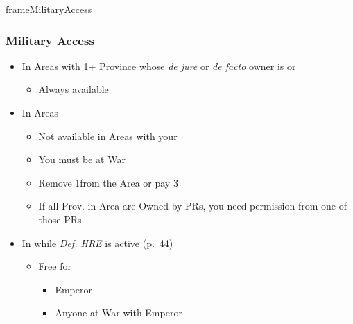 \documentclass[10pt]{article}
\begin{document}
\begin{dynamiccontents*}{frameMilitaryAccess}
	\subsubsection*{Military Access }
	\begin{itemize}
		\item In Areas with 1+ Province whose \emph{de jure} or \emph{de facto} owner is  or 
		\begin{itemize}
			\item Always available
		\end{itemize}
		\item In  Areas
		\begin{itemize}
			\item Not available in Areas with your \claims
			\item You must be at War
			\item Remove 1\influence from the Area or pay 3\ducats
			\item If all Prov. in Area are Owned by PRs, you need permission from one of those PRs
		\end{itemize}
		\item In  while \emph{Def. HRE} is active (p.~44)
		\begin{itemize}
			\item Free for
			\begin{itemize}
				\item Emperor
				\item Anyone at War with Emperor
			\end{itemize}
		\end{itemize}
	\end{itemize}
\end{dynamiccontents*}
\end{document}
